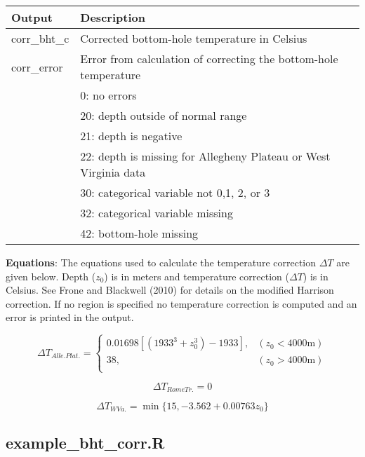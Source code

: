 \documentclass[12pt,a4paper]{article}
\begin{document}
\begin{table}[H]
\begin{tabular} {p{2cm} p{11cm}}
\hline
\textbf{Output} & \textbf{Description}\\
\hline
\textsf{corr\_bht\_c} 	 & Corrected bottom-hole temperature in Celsius \\
\textsf{corr\_error}		 & Error from calculation of correcting the bottom-hole temperature\\
  & 0: no errors\\
  & 20: depth outside of normal range\\
  & 21: depth is negative\\
  & 22: depth is missing for Allegheny Plateau or West Virginia data\\
  & 30: categorical variable not 0,1, 2, or 3\\
  & 32: categorical variable missing\\
  & 42: bottom-hole missing\\
\hline
\end{tabular} 
\end{table}

\textbf{Equations}: The equations used to calculate the temperature correction $\Delta T$ are given below. Depth ($z_0$) is in meters and temperature correction ($\Delta T$) is in Celsius. See Frone and Blackwell (2010) for details on the modified Harrison correction. If no region is specified no temperature correction is computed and an error is printed in the output.

\begin{equation} \label{DT_ap}
{\Delta T}_{Alle. Plat.} =  \left\{
\begin{array}{ll}
0.01698\left[ \left(1933^3 + z_0^3\right) - 1933 \right],	& (z_0 < 4000 \mathrm{m})\\
38,  & (z_0 > 4000 \mathrm{m})\\
\end{array} \right .
\end{equation}

\begin{equation} \label{DT_rt}
{\Delta T}_{Rome Tr.} = 0
\end{equation}

\begin{equation} \label{DT_wv}
{\Delta T}_{W Va.} = \min\{15, -3.562+0.00763z_0 \}
\end{equation}

\subsection*{\textsf{example\_bht\_corr.R}}
\end{document}
